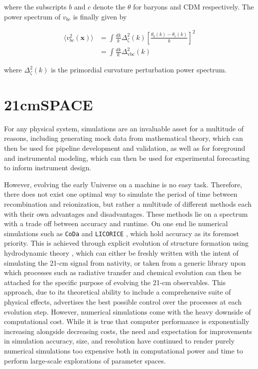 \documentclass[floats,floatfix,showpacs,amssymb,prd,superscriptaddress,nofootinbib]{revtex4-2} %
\newcommand{\code}{\texttt}
\newcommand{\red}{\textcolor{red}}
\begin{document}
\noindent where the subscripts $b$ and $c$ denote the $\theta$ for baryons and CDM respectively. The power spectrum of $v_{bc}$ is finally given by 

\begin{equation}
\begin{split}
        \langle v_{bc}^2 (\textbf{x}) \rangle 
        & = \int \frac{dk}{k} \Delta_\zeta^2 (k) \left[ \frac{\theta_b (k) - \theta_c (k)}{k} \right]^2 \\
        & = \int \frac{dk}{k} \Delta_{\text{vbc}}^2 (k)
\end{split}
\end{equation}

\noindent where $\Delta_\zeta ^2 (k)$ is the primordial curvature perturbation power spectrum.

\newpage
\section{21cmSPACE}
For any physical system, simulations are an invaluable asset for a multitude of reasons, including generating mock data from mathematical theory, which can then be used for pipeline development and validation, as well as for foreground and instrumental modeling, which can then be used for experimental forecasting to inform instrument design. 

However, evolving the early Universe on a machine is no easy task. Therefore, there does not exist one optimal way to simulate the period of time between recombination and reionization, but rather a multitude of different methods each with their own advantages and disadvantages. These methods lie on a spectrum with a trade off between accuracy and runtime. On one end lie numerical simulations such as \code{CoDa} \citep{Ocvirk_2015} and \code{LICORICE} \citep{Semelin_2017}, which hold accuracy as its foremost priority. This is achieved through explicit evolution of structure formation using hydrodynamic theory \citep{gessey-jones_thesis}, which can either be freshly written with the intent of simulating the 21-cm signal from nativity, or taken from a generic library upon which processes such as radiative transfer and chemical evolution can then be attached for the specific purpose of evolving the 21-cm observables. This approach, due to its theoretical ability to include a comprehensive suite of physical effects, advertises the best possible control over the processes at each evolution step. However, numerical simulations come with the heavy downside of computational cost. 
While it is true that computer performance is exponentially increasing alongside decreasing costs, the need and expectation for improvements in simulation accuracy, size, and resolution have continued to render purely numerical simulations too expensive both in computational power and time to perform large-scale explorations of parameter spaces.
\end{document}
